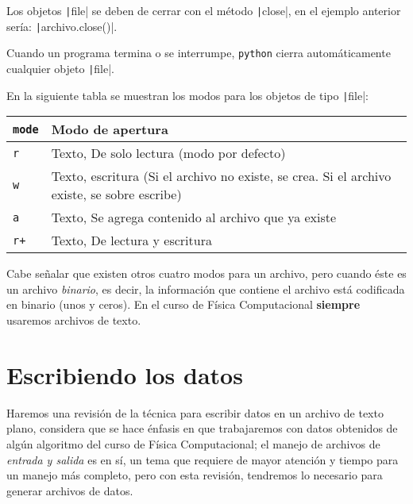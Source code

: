 \documentclass[12pt]{article}
\newcommand{\python}{\texttt{python}}
\begin{document}
Los objetos \texttt|file| se deben de cerrar con el método \texttt|close|, en el ejemplo anterior sería: \texttt|archivo.close()|.
\par
Cuando un programa termina o se interrumpe, \python{} cierra automáticamente cualquier objeto \texttt|file|.
\par
En la siguiente tabla se muestran los modos para los objetos de tipo \texttt|file|:
\begin{table}[H]
\begin{tabular}{| m{2cm} | m{12cm} |}
\hline
\texttt{mode} & Modo de apertura \\ \hline
\texttt{r} & Texto, De solo lectura (modo por defecto) \\ \hline
\texttt{w} & Texto, escritura (Si el archivo no existe, se crea. Si el archivo existe, se sobre escribe) \\ \hline
\texttt{a} & Texto, Se agrega contenido al archivo que ya existe \\ \hline
\texttt{r+} & Texto, De lectura y escritura \\ \hline
\end{tabular}
\end{table}
Cabe señalar que existen otros cuatro modos para un archivo, pero cuando éste es un archivo \emph{binario}, es decir, la información que contiene el archivo está codificada en binario (unos y ceros). En el curso de Física Computacional \textbf{siempre} usaremos archivos de texto.
\section{Escribiendo los datos}
Haremos una revisión de la técnica para escribir datos en un archivo de texto plano, considera que se hace énfasis en que trabajaremos con datos obtenidos de algún algoritmo del curso de Física Computacional; el manejo de archivos de \emph{entrada y salida} es en sí, un tema que requiere de mayor atención y tiempo para un manejo más completo, pero con esta revisión, tendremos lo necesario para generar archivos de datos.
\end{document}

